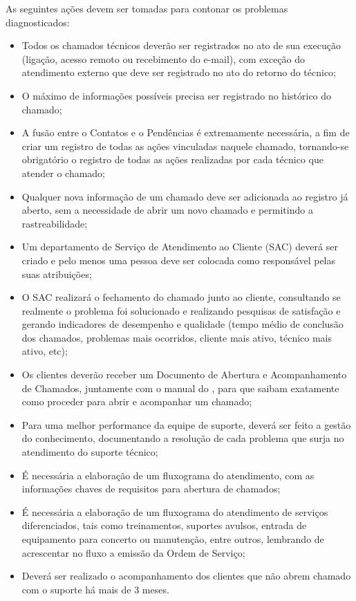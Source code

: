 As seguintes ações devem ser tomadas para contonar os problemas diagnosticados:

\begin{itemize}

\item Todos os chamados técnicos deverão ser registrados no ato de sua execução (ligação, acesso remoto ou recebimento do e-mail), com exceção do atendimento externo que deve ser registrado no ato do retorno do técnico;

\item O máximo de informações possíveis precisa ser registrado no histórico do chamado;

\item A fusão entre o Contatos e o Pendências é extremamente necessária, a fim de criar um registro de todas as ações vinculadas naquele chamado, tornando-se obrigatório o registro de todas as ações realizadas por cada técnico que atender o chamado;

\item Qualquer nova informação de um chamado deve ser adicionada ao registro já aberto, sem a necessidade de abrir um novo chamado e permitindo a rastreabilidade;

\item Um departamento de Serviço de Atendimento ao Cliente (SAC) deverá ser criado e pelo menos uma pessoa deve ser colocada como responsável pelas suas atribuições;

\item O SAC realizará o fechamento do chamado junto ao cliente, consultando se realmente o problema foi solucionado e realizando pesquisas de satisfação e gerando indicadores de desempenho e qualidade (tempo médio de conclusão dos chamados, problemas mais ocorridos, cliente mais ativo, técnico mais ativo, etc);

\item Os clientes deverão receber um Documento de Abertura e Acompanhamento de Chamados, juntamente com o manual  do \sw, para que saibam exatamente como proceder para abrir e acompanhar um chamado;

\item Para uma melhor performance da equipe de suporte, deverá ser feito a gestão do conhecimento, documentando a resolução de cada problema que surja no atendimento do suporte técnico;

\item É necessária a elaboração de um fluxograma do atendimento, com as informações chaves de requisitos para abertura de chamados;

\item É necessária a elaboração de um fluxograma do atendimento de serviços diferenciados, tais como treinamentos, suportes avulsos, entrada de equipamento para concerto ou manutenção, entre outros, lembrando de acrescentar no fluxo a emissão da Ordem de Serviço;

\item Deverá ser realizado o acompanhamento dos clientes que não abrem chamado com o suporte há mais de 3 meses.

\end{itemize}


